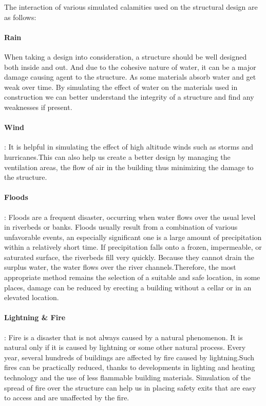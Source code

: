 \documentclass[conference]{IEEEtran}
\begin{document}
The interaction of various simulated calamities used on the structural design are as follows:
\paragraph{Rain}  When taking a design into consideration, a structure should be well designed both inside and out. And due to the cohesive nature of water, it can be a major damage causing agent to the structure. As some materials absorb water and get weak over time. By simulating the effect of water on the materials used in construction we can better understand the integrity of a structure and find any weaknesses if present.

\paragraph{Wind}: It is helpful in simulating the effect of high altitude winds such as storms and hurricanes.This can also help us create a better design by managing the ventilation areas, the flow of air in the building thus minimizing the damage to the structure.   

\paragraph{Floods}: Floods are a frequent disaster, occurring when water flows over the usual level in riverbeds or banks. Floods usually result from a combination of various unfavorable events, an especially significant one is a large amount of precipitation within a relatively short time. If precipitation falls onto a frozen, impermeable, or saturated surface, the riverbeds fill very quickly. Because they cannot drain the surplus water,
the water flows over the river channels.Therefore, the most appropriate method remains the selection of a suitable and safe location, in some places, damage can be reduced by erecting a building without a cellar or in an elevated location.

\paragraph{Lightning \& Fire}: Fire is a disaster that is not always caused by a natural phenomenon. It is natural only if it is caused by
lightning or some other natural process. Every year, several hundreds of buildings are affected by fire caused by lightning.Such fires can be practically reduced, thanks to developments in lighting and heating technology and the use of less flammable building materials. Simulation of the spread of fire over the structure can help us in placing safety exits that are easy to access and are unaffected by the fire.
\end{document}
